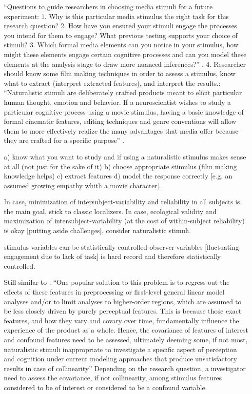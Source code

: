 %
``Questions to guide researchers in choosing media stimuli for a future
experiment:
%
1. Why is this particular media stimulus the right task for this research
question?
%
2. How have you ensured your stimuli engage the processes you intend for them to
engage? What previous testing supports your choice of stimuli?
%
3. Which formal media elements can you notice in your stimulus, how might these
elements engage certain cognitive processes and can you model these elements at
the analysis stage to draw more nuanced inferences?''
\citep{grall2022leveraging}.
%
4. Researcher should know some film making techniques in order to assess a
stimulus, know what to extract (interpret extracted features), and interpret the
results.: ``Naturalistic stimuli are deliberately crafted products meant to
elicit particular human thought, emotion and behavior.
%
If a neuroscientist wishes to study a particular cognitive process using a movie
stimulus, having a basic knowledge of formal cinematic features, editing
techniques and genre conventions will allow them to more effectively realize the
many advantages that media offer because they are crafted for a specific
purpose'' \citep{grall2022leveraging}.

%
a) know what you want to study and if using a naturalistic stimulus makes sense
at all (not just for the sake of it)
%
b) choose appropriate stimulus (film making knowledge helps)
%
c) extract features
%
d) model the response correctly [e.g. an assumed growing empathy whith a movie
character].

In case, minimization of intersubject-variability and reliability in all
subjects is the main goal, stick to classic localizers.
%
In case, ecological validity and maximization of intersubject-variability (at
the cost of within-subject reliability) is okay [putting aside challenges],
consider naturalistic stimuli.

stimulus variables can be statistically controlled
observer variables [fluctuating engagement due to lack of task] is hard record
and therefore statistically controlled.

%
Still similar to \citet{grall2022leveraging}: ``One popular solution to this
problem is to regress out the effects of these features in preprocessing or
first-level general linear model analyses and/or to limit analyses to
higher-order regions, which are assumed to be less closely driven by purely
perceptual features.
%
This is because those exact features, and how they vary and covary over time,
fundamentally influence the experience of the product as a whole.
%
Hence, the covariance of features of interest and confound features need to be
assessed, ultimately deeming some, if not most, naturalistic stimuli
inappropriate to investigate a specific aspect of perception and cognition under
current modeling approaches that produce unsatisfactory results in case of
collinearity''
%
Depending on the research question, a investigator need to assess the
covariance, if not collinearity, among stimulus features considered to be of
interest or considered to be a confound variable.


